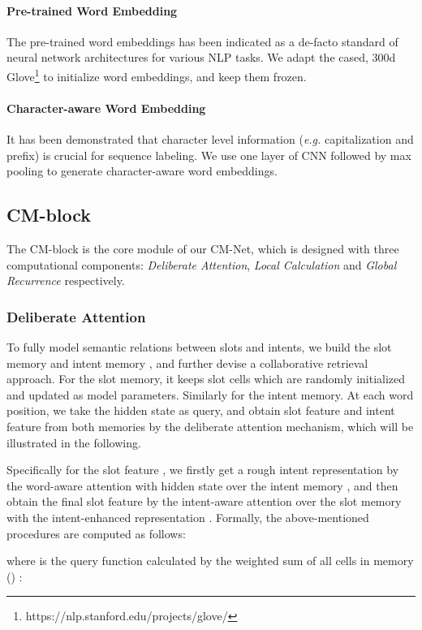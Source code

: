 \documentclass[11pt,a4paper]{article}
\begin{document}
\paragraph{Pre-trained Word Embedding}
The pre-trained word embeddings has been indicated as a de-facto standard of neural network architectures for various NLP tasks. 
We adapt the cased, 300d Glove\footnote{https://nlp.stanford.edu/projects/glove/} \cite{Glove} to initialize word embeddings, and keep them frozen.

\paragraph{Character-aware Word Embedding}
It has been demonstrated that character level information ({\em e.g.} capitalization and prefix) \cite{collobert_2011} is crucial for sequence labeling. We use one layer of CNN followed by max pooling to generate character-aware word embeddings.

\subsection{CM-block}
The CM-block is the core module of our CM-Net, which is designed with three computational components: \emph{Deliberate Attention}, \emph{Local Calculation} and \emph{Global Recurrence} respectively.

\subsubsection*{Deliberate Attention} To fully model semantic relations between slots and intents, 
we build the slot memory  and  intent memory , and further devise a collaborative retrieval approach.
For the slot memory, it keeps  slot cells which are randomly initialized and updated as model parameters. Similarly for the intent memory.
At each word position, we take the hidden state  as query, and obtain slot feature  and intent feature  from both memories by the deliberate attention mechanism, which will be illustrated in the following.

Specifically for the slot feature , we firstly get a rough intent representation  by the word-aware attention with hidden state  over the intent memory , and then obtain the final slot feature  by the intent-aware attention over the slot memory  with the intent-enhanced representation .
Formally, the above-mentioned procedures are computed as follows:

where  is the query function calculated by the weighted sum of all cells  in memory  ()  :
\end{document}
